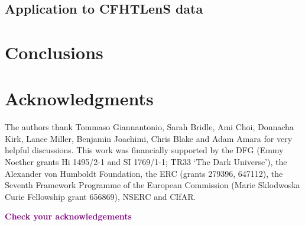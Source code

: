 \documentclass[fleqn,usenatbib]{mnras} %
\newcommand{\ch}[1]{\textcolor{purple}{\bf #1}}
\begin{document}
\subsection{Application to CFHTLenS data}
\label{sec:cfhtlens}






\section{Conclusions}


\section*{Acknowledgments}

The authors thank Tommaso Giannantonio, Sarah Bridle, Ami Choi, Donnacha Kirk, Lance Miller, Benjamin Joachimi, Chris Blake and Adam Amara for very helpful discussions.
This work was financially supported by the DFG (Emmy Noether grants Hi 1495/2-1 and SI 1769/1-1; TR33 `The Dark Universe'), the Alexander von Humboldt Foundation, the ERC (grants 279396, 647112), the Seventh Framework Programme of the European Commission (Marie Sklodwoska Curie Fellowship grant 656869), NSERC and CIfAR.

\ch{Check your acknowledgements}



\end{document}
